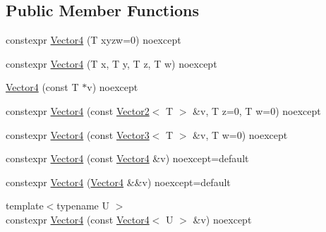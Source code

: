 \subsection*{Public Member Functions}
\begin{DoxyCompactItemize}
\item 
constexpr \hyperlink{structmage_1_1_vector4_3_01_t_00_01typename_01std_1_1enable__if__t_3_01std_1_1is__arithmetic__v_3_01_t_01_4_01_4_01_4_a87360915b8d2d492aab245926982f680}{Vector4} (T xyzw=0) noexcept
\item 
constexpr \hyperlink{structmage_1_1_vector4_3_01_t_00_01typename_01std_1_1enable__if__t_3_01std_1_1is__arithmetic__v_3_01_t_01_4_01_4_01_4_a38e7cc23b8f95714dbeb58f743116d04}{Vector4} (T x, T y, T z, T w) noexcept
\item 
\hyperlink{structmage_1_1_vector4_3_01_t_00_01typename_01std_1_1enable__if__t_3_01std_1_1is__arithmetic__v_3_01_t_01_4_01_4_01_4_a2b6bb42ebaa5ace70bcea453155dda28}{Vector4} (const T $\ast$v) noexcept
\item 
constexpr \hyperlink{structmage_1_1_vector4_3_01_t_00_01typename_01std_1_1enable__if__t_3_01std_1_1is__arithmetic__v_3_01_t_01_4_01_4_01_4_a4e8cbabc88d11a6642e830b1c809fe63}{Vector4} (const \hyperlink{structmage_1_1_vector2}{Vector2}$<$ T $>$ \&v, T z=0, T w=0) noexcept
\item 
constexpr \hyperlink{structmage_1_1_vector4_3_01_t_00_01typename_01std_1_1enable__if__t_3_01std_1_1is__arithmetic__v_3_01_t_01_4_01_4_01_4_a21f38ece7704f628fe87f599083f7833}{Vector4} (const \hyperlink{structmage_1_1_vector3}{Vector3}$<$ T $>$ \&v, T w=0) noexcept
\item 
constexpr \hyperlink{structmage_1_1_vector4_3_01_t_00_01typename_01std_1_1enable__if__t_3_01std_1_1is__arithmetic__v_3_01_t_01_4_01_4_01_4_ad0f131d28d7e1d036e009a37070910dc}{Vector4} (const \hyperlink{structmage_1_1_vector4}{Vector4} \&v) noexcept=default
\item 
constexpr \hyperlink{structmage_1_1_vector4_3_01_t_00_01typename_01std_1_1enable__if__t_3_01std_1_1is__arithmetic__v_3_01_t_01_4_01_4_01_4_a294385351d86fb5720231f20695bce34}{Vector4} (\hyperlink{structmage_1_1_vector4}{Vector4} \&\&v) noexcept=default
\item 
{\footnotesize template$<$typename U $>$ }\\constexpr \hyperlink{structmage_1_1_vector4_3_01_t_00_01typename_01std_1_1enable__if__t_3_01std_1_1is__arithmetic__v_3_01_t_01_4_01_4_01_4_a90883024948ea7b993a4114cec61df0e}{Vector4} (const \hyperlink{structmage_1_1_vector4}{Vector4}$<$ U $>$ \&v) noexcept

\end{DoxyCompactItemize}
